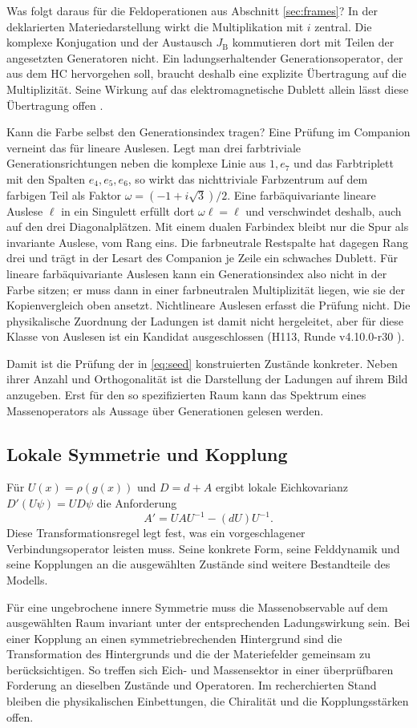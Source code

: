 Was folgt daraus für die Feldoperationen aus Abschnitt \ref{sec:frames}? In der deklarierten Materiedarstellung wirkt die Multiplikation mit \(i\) zentral. Die komplexe Konjugation und der Austausch \(J_{\mathrm B}\) kommutieren dort mit Teilen der angesetzten Generatoren nicht. Ein ladungserhaltender Generationsoperator, der aus dem HC hervorgehen soll, braucht deshalb eine explizite Übertragung auf die Multiplizität. Seine Wirkung auf das elektromagnetische Dublett allein lässt diese Übertragung offen \cite{dixon-commutant}.

Kann die Farbe selbst den Generationsindex tragen? Eine Prüfung im Companion verneint das für lineare Auslesen. Legt man drei
farbtriviale Generationsrichtungen neben die komplexe Linie aus \(1,e_7\) und das Farbtriplett mit den Spalten \(e_4,e_5,e_6\), so wirkt
das nichttriviale Farbzentrum auf dem farbigen Teil als Faktor \(\omega=(-1+i\sqrt3)/2\). Eine farbäquivariante lineare Auslese \(\ell\) in ein
Singulett erfüllt dort \(\omega\ell=\ell\) und verschwindet deshalb, auch auf den drei Diagonalplätzen. Mit einem dualen Farbindex bleibt nur die
Spur als invariante Auslese, vom Rang eins. Die farbneutrale Restspalte hat dagegen Rang drei und trägt in der Lesart des Companion je
Zeile ein schwaches Dublett. Für lineare farbäquivariante Auslesen kann ein Generationsindex also nicht in der Farbe sitzen; er muss
dann in einer farbneutralen Multiplizität liegen, wie sie der Kopienvergleich oben ansetzt. Nichtlineare Auslesen erfasst die Prüfung
nicht. Die physikalische Zuordnung der Ladungen ist damit nicht hergeleitet, aber für diese Klasse von Auslesen ist ein Kandidat
ausgeschlossen (H113, Runde v4.10.0-r30 \cite{h113,companion}).

Damit ist die Prüfung der in \eqref{eq:seed} konstruierten Zustände konkreter. Neben ihrer Anzahl und Orthogonalität ist die Darstellung der Ladungen auf ihrem Bild anzugeben. Erst für den so spezifizierten Raum kann das Spektrum eines Massenoperators als Aussage über Generationen gelesen werden.

\subsection{Lokale Symmetrie und Kopplung}

Für \(U(x)=\rho(g(x))\) und \(D=d+A\) ergibt lokale Eichkovarianz \(D'(U\psi)=U D\psi\) die Anforderung
\[
 A'=UAU^{-1}-(dU)U^{-1}.
\]
Diese Transformationsregel legt fest, was ein vorgeschlagener Verbindungsoperator leisten muss. Seine konkrete Form, seine Felddynamik und seine Kopplungen an die ausgewählten Zustände sind weitere Bestandteile des Modells.

Für eine ungebrochene innere Symmetrie muss die Massenobservable auf dem ausgewählten Raum invariant unter der entsprechenden Ladungswirkung sein. Bei einer Kopplung an einen symmetriebrechenden Hintergrund sind die Transformation des Hintergrunds und die der Materiefelder gemeinsam zu berücksichtigen. So treffen sich Eich- und Massensektor in einer überprüfbaren Forderung an dieselben Zustände und Operatoren. Im recherchierten Stand bleiben die physikalischen Einbettungen, die Chiralität und die Kopplungsstärken offen.
